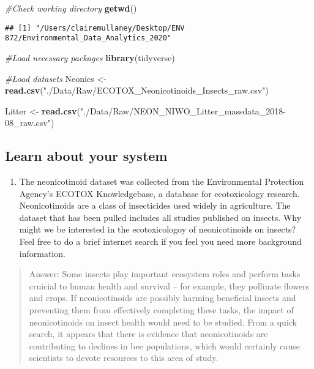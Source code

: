 \documentclass[]{article}
\newenvironment{Shaded}{\begin{snugshade}}{\end{snugshade}}
\newcommand{\CommentTok}[1]{\textcolor[rgb]{0.56,0.35,0.01}{\textit{#1}}}
\newcommand{\KeywordTok}[1]{\textcolor[rgb]{0.13,0.29,0.53}{\textbf{#1}}}
\newcommand{\NormalTok}[1]{#1}
\newcommand{\StringTok}[1]{\textcolor[rgb]{0.31,0.60,0.02}{#1}}
\providecommand{\tightlist}{%
  \setlength{\itemsep}{0pt}\setlength{\parskip}{0pt}}
\begin{document}
\begin{Shaded}
\begin{Highlighting}[]
\CommentTok{#Check working directory}
\KeywordTok{getwd}\NormalTok{()}
\end{Highlighting}
\end{Shaded}

\begin{verbatim}
## [1] "/Users/clairemullaney/Desktop/ENV 872/Environmental_Data_Analytics_2020"
\end{verbatim}

\begin{Shaded}
\begin{Highlighting}[]
\CommentTok{#Load necessary packages}
\KeywordTok{library}\NormalTok{(tidyverse)}

\CommentTok{#Load datasets}
\NormalTok{Neonics <-}\StringTok{ }\KeywordTok{read.csv}\NormalTok{(}\StringTok{"./Data/Raw/ECOTOX_Neonicotinoids_Insects_raw.csv"}\NormalTok{)}

\NormalTok{Litter <-}\StringTok{ }\KeywordTok{read.csv}\NormalTok{(}\StringTok{"./Data/Raw/NEON_NIWO_Litter_massdata_2018-08_raw.csv"}\NormalTok{)}
\end{Highlighting}
\end{Shaded}

\hypertarget{learn-about-your-system}{%
\subsection{Learn about your system}\label{learn-about-your-system}}

\begin{enumerate}
\def\labelenumi{\arabic{enumi}.}
\setcounter{enumi}{1}
\tightlist
\item
  The neonicotinoid dataset was collected from the Environmental
  Protection Agency's ECOTOX Knowledgebase, a database for ecotoxicology
  research. Neonicotinoids are a class of insecticides used widely in
  agriculture. The dataset that has been pulled includes all studies
  published on insects. Why might we be interested in the ecotoxicologoy
  of neonicotinoids on insects? Feel free to do a brief internet search
  if you feel you need more background information.
\end{enumerate}

\begin{quote}
Answer: Some insects play important ecosystem roles and perform tasks
cruicial to human health and survival -- for example, they pollinate
flowers and crops. If neonicotinoids are possibly harming beneficial
insects and preventing them from effectively completing these tasks, the
impact of neonicotinoids on insect health would need to be studied. From
a quick search, it appears that there is evidence that neonicotinoids
are contributing to declines in bee populations, which would certainly
cause scientists to devote resources to this area of study.
\end{quote}
\end{document}
